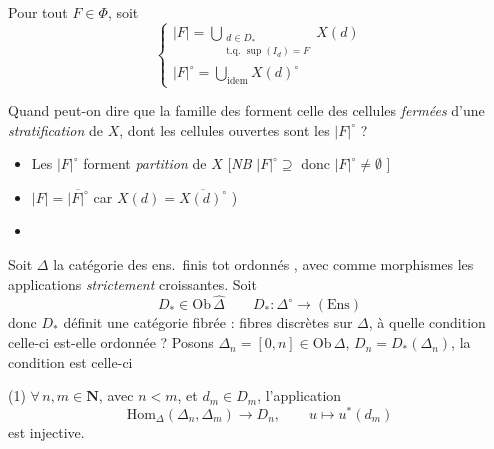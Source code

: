 \documentclass[11pt,a4paper]{article}
\begin{document}
Pour tout $F \in \Phi$, soit
\[
  \left\lbrace
  \begin{array}{l}
    |F| = \displaystyle\bigcup_{\substack{d \in D_* \\ \text{t.q.\ }
    \sup(I_d) = F}} X(d) \\[3ex]
    |F|^\circ = \displaystyle\bigcup_{\text{idem}} X(d)^\circ
  \end{array}
  \right.
\]

Quand peut-on dire que la famille des 
\struck{\ill{}} forment celle des cellules \emph{fermées} d'une
\emph{stratification} de $X$, dont les cellules ouvertes sont les
$|F|^\circ$ ?

\begin{itemize}
  \item[a)] Les $|F|^\circ$ forment \emph{partition} de $X$ [\emph{NB}
  $|F|^\circ \supseteq$ \struck{\ill{}}  donc $|F|^\circ \neq \emptyset$ ]
  \item[b)] $|F| = \overline{|F|^\circ}$ car $X(d) = \overline{X(d)^\circ}$
  \quad ) 
  \item[c)] 
\end{itemize}

Soit $\Delta$ la catégorie des ens.\ finis tot ordonnés
, avec comme morphismes les applications
\emph{strictement} croissantes. Soit
\[
  D_* \in \mathrm{Ob}\, \widehat{\Delta} \qquad D_* : \Delta^\circ
  \longrightarrow (\mathrm{Ens})
\]
donc $D_*$ définit une catégorie fibrée : fibres discrètes sur $\Delta$,
à quelle condition celle-ci est-elle ordonnée  ? Posons $\Delta_n = [0,n] \in
\mathrm{Ob}\,\Delta$, $D_n = D_*(\Delta_n)$, la condition est celle-ci

(1) $\forall\, n, m \in \mathbf{N}$, avec $n < m$, et $d_m \in D_m$,
l'application
\[
  \mathrm{Hom}_\Delta(\Delta_n, \Delta_m) \longrightarrow D_n, \qquad u
  \longmapsto u^*(d_m)
\]
est injective.
\end{document}
